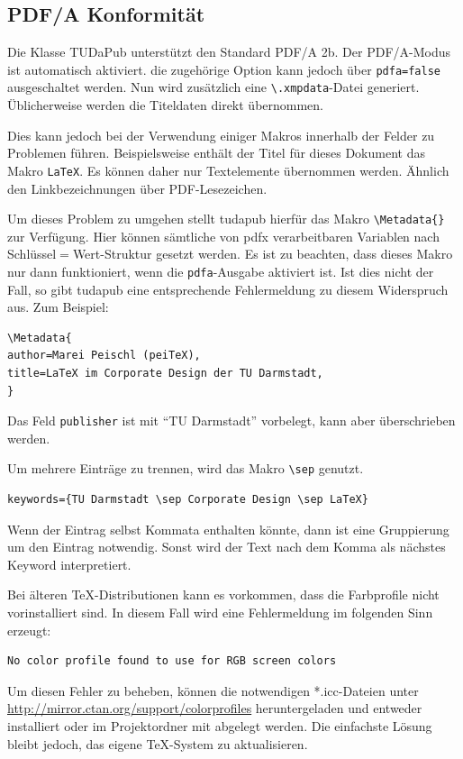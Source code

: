 \documentclass[
	ngerman,%
	accentcolor=9c,%
]{tudapub}
\newcommand*{\code}[1]{\texttt{#1}}
\newcommand*{\pkg}[1]{\textsf{#1}}
\newcommand*{\cls}[1]{\textsf{#1}}
\begin{document}
\subsection{PDF/A Konformität}
Die Klasse TUDaPub unterstützt den Standard PDF/A 2b. Der PDF/A-Modus ist automatisch aktiviert. die zugehörige Option kann jedoch über \code{pdfa=false} ausgeschaltet werden.
Nun wird zusätzlich eine \code{\textbackslash.xmpdata}-Datei generiert. Üblicherweise werden die Titeldaten direkt übernommen.

Dies kann jedoch bei der Verwendung einiger Makros innerhalb der Felder zu Problemen führen. Beispielsweise enthält der Titel für dieses Dokument das Makro \code{\LaTeX}. Es können daher nur Textelemente übernommen werden. Ähnlich den Linkbezeichnungen über PDF-Lesezeichen.

Um dieses Problem zu umgehen stellt \cls{tudapub} hierfür das Makro \code{\textbackslash{}Metadata\{\}} zur Verfügung. Hier können sämtliche von \pkg{pdfx} verarbeitbaren Variablen nach Schlüssel$=$Wert-Struktur gesetzt werden. Es ist zu beachten, dass dieses Makro nur dann funktioniert, wenn die \code{pdfa}-Ausgabe aktiviert ist. Ist dies nicht der Fall, so gibt \cls{tudapub} eine entsprechende Fehlermeldung zu diesem Widerspruch aus.
Zum Beispiel:
\begin{verbatim}
\Metadata{
author=Marei Peischl (peiTeX),
title=LaTeX im Corporate Design der TU Darmstadt,
}
\end{verbatim}
Das Feld \code{publisher} ist mit \enquote{TU Darmstadt} vorbelegt, kann aber überschrieben werden.

Um mehrere Einträge zu trennen, wird das Makro \code{\textbackslash{}sep} genutzt.
\begin{verbatim}
keywords={TU Darmstadt \sep Corporate Design \sep LaTeX}
\end{verbatim}
Wenn der Eintrag selbst Kommata enthalten könnte, dann ist eine Gruppierung um den Eintrag notwendig. Sonst wird der Text nach dem Komma als nächstes Keyword interpretiert.


Bei älteren \TeX-Distributionen kann es vorkommen, dass die Farbprofile nicht vorinstalliert sind. In diesem Fall wird eine Fehlermeldung im folgenden Sinn erzeugt:
\begin{verbatim}
No color profile found to use for RGB screen colors
\end{verbatim}
Um diesen Fehler zu beheben, können die notwendigen *.icc-Dateien unter \url{http://mirror.ctan.org/support/colorprofiles} heruntergeladen und entweder installiert oder im Projektordner mit abgelegt werden. Die einfachste Lösung bleibt jedoch, das eigene \TeX-System zu aktualisieren.
\end{document}

